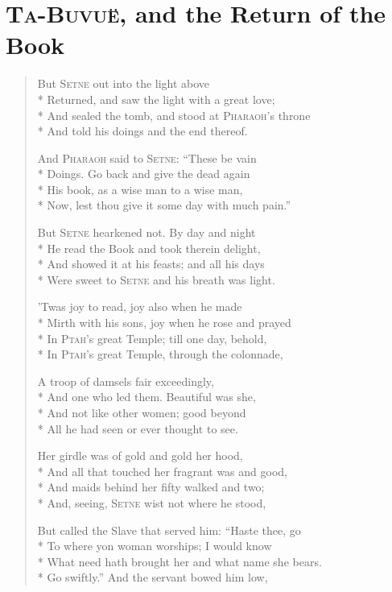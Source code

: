 \documentclass[12pt]{article}
\newcommand{\vin}{\hspace{1em}}
\begin{document}
\section*{\textsc{Ta-Buvu\"{e}}, and the Return of the Book}

\begin{verse}
But \textsc{Setne} out into the light above\\*
Returned, and saw the light with a great love;\\*
\vin And sealed the tomb, and stood at \textsc{Pharaoh}'s throne\\*
And told his doings and the end thereof.

And \textsc{Pharaoh} said to \textsc{Setne}: ``These be vain\\*
Doings. Go back and give the dead again\\*
\vin His book, as a wise man to a wise man,\\*
Now, lest thou give it some day with much pain.''

But \textsc{Setne} hearkened not. By day and night\\*
He read the Book and took therein delight,\\*
\vin And showed it at his feasts; and all his days\\*
Were sweet to \textsc{Setne} and his breath was light.

'Twas joy to read, joy also when he made\\*
Mirth with his sons, joy when he rose and prayed\\*
\vin In \textsc{Ptah}'s great Temple; till one day, behold,\\*
In \textsc{Ptah}'s great Temple, through the colonnade,

A troop of damsels fair exceedingly,\\*
And one who led them. Beautiful was she,\\*
\vin And not like other women; good beyond\\*
All he had seen or ever thought to see.

Her girdle was of gold and gold her hood,\\*
And all that touched her fragrant was and good,\\*
\vin And maids behind her fifty walked and two;\\*
And, seeing, \textsc{Setne} wist not where he stood,

But called the Slave that served him: ``Haste thee, go\\*
To where yon woman worships; I would know\\*
\vin What need hath brought her and what name she bears.\\*
Go swiftly.'' And the servant bowed him low,


\end{verse}
\end{document}
